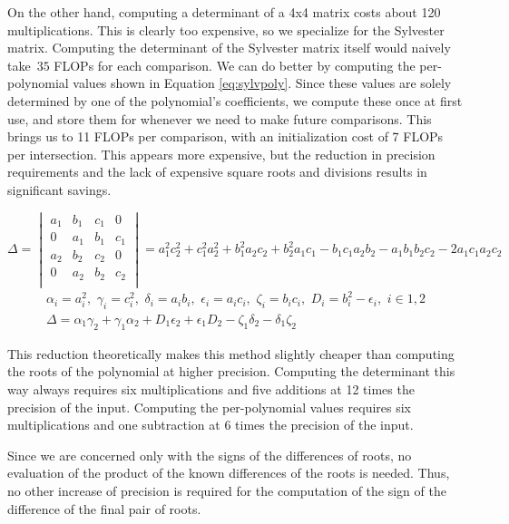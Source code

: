 \documentclass{cccg16}
\begin{document}
On the other hand, computing a determinant of a 4x4 matrix costs about
120 multiplications.  This is clearly too expensive, so we specialize
for the Sylvester matrix.  Computing the determinant of the Sylvester
matrix itself would naively take~$35$ FLOPs for each comparison.  We
can do better by computing the per-polynomial values shown in Equation
\ref{eq:sylvpoly}.  Since these values are solely determined by one of
the polynomial's coefficients, we compute these once at first use, and
store them for whenever we need to make future comparisons.  This
brings us to 11 FLOPs per comparison, with an initialization cost of 7
FLOPs per intersection.  This appears more expensive, but the
reduction in precision requirements and the lack of expensive square
roots and divisions results in significant savings.
\begin{figure*}
  \begin{equation*}
    \Delta=\begin{vmatrix}
    a_1 & b_1 & c_1 & 0\\
    0 & a_1 & b_1 & c_1\\
    a_2 & b_2 & c_2 & 0\\
    0 & a_2 & b_2 & c_2\\
    \end{vmatrix}=
    a_1^2 c_2^2 + c_1^2 a_2^2 + b_1^2 a_2 c_2 + b_2^2 a_1 c_1 -
    b_1 c_1 a_2 b_2 - a_1 b_1 b_2 c_2 - 2 a_1 c_1 a_2 c_2
  \end{equation*}
  \begin{align}
    \alpha_i=a_i^2,\,\, \gamma_i=c_i^2,\,\,
    \delta_i=a_i b_i,\,\, \epsilon_i=a_i c_i,\,\, \zeta_i=b_i c_i,\,\,
    D_i=b_i^2-\epsilon_i,\,\,
    i\in {1, 2}\\
    \Delta = \alpha_1 \gamma_2 + \gamma_1 \alpha_2 +
    D_1 \epsilon_2 + \epsilon_1 D_2 - \zeta_1 \delta_2 -
    \delta_1 \zeta_2
  \label{eq:sylvpoly}
  \end{align}
\end{figure*}
This reduction theoretically makes this method slightly cheaper than
computing the roots of the polynomial at higher precision.  Computing
the determinant this way always requires six multiplications and five
additions at 12 times the precision of the input.  Computing the
per-polynomial values requires six multiplications and one subtraction
at 6 times the precision of the input.

Since we are concerned only with the signs of the differences of
roots, no evaluation of the product of the known differences of the
roots is needed.  Thus, no other increase of precision is required for
the computation of the sign of the difference of the final pair of
roots.
\end{document}
